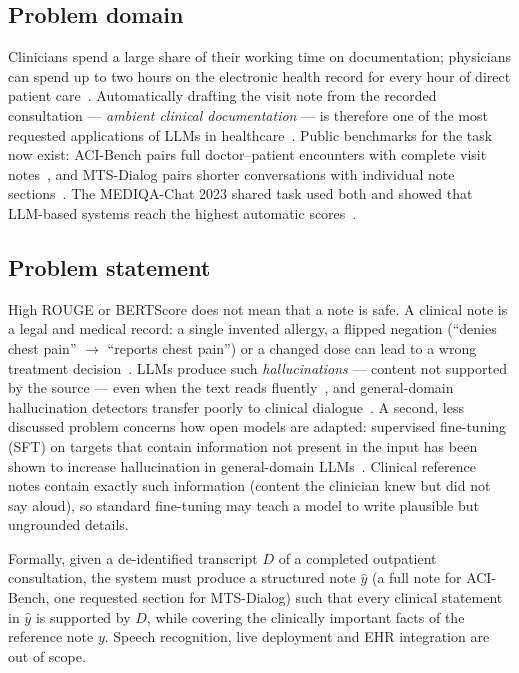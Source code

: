 \documentclass[conference]{IEEEtran}
\begin{document}
\subsection{Problem domain}
Clinicians spend a large share of their working time on documentation; physicians can spend up to two
hours on the electronic health record for every hour of direct patient care~\cite{vanveen2024}.
Automatically drafting the visit note from the recorded consultation --- \emph{ambient clinical
documentation} --- is therefore one of the most requested applications of LLMs in
healthcare~\cite{asgari2025,yim2023aci}. Public benchmarks for the task now exist: ACI-Bench pairs full
doctor--patient encounters with complete visit notes~\cite{yim2023aci}, and MTS-Dialog pairs shorter
conversations with individual note sections~\cite{abacha2023mts}. The MEDIQA-Chat 2023 shared task used
both and showed that LLM-based systems reach the highest automatic scores~\cite{abacha2023overview}.

\subsection{Problem statement}
High ROUGE or BERTScore does not mean that a note is safe. A clinical note is a legal and medical record:
a single invented allergy, a flipped negation (``denies chest pain'' $\rightarrow$ ``reports chest pain'')
or a changed dose can lead to a wrong treatment decision~\cite{asgari2025}. LLMs produce such
\emph{hallucinations} --- content not supported by the source --- even when the text reads
fluently~\cite{bn2025fact,das2025}, and general-domain hallucination detectors transfer poorly to clinical
dialogue~\cite{bn2025fact}. A second, less discussed problem concerns how open models are adapted:
supervised fine-tuning (SFT) on targets that contain information not present in the input has been shown to
increase hallucination in general-domain LLMs~\cite{gekhman2024,kaplan2026}. Clinical reference notes
contain exactly such information (content the clinician knew but did not say aloud), so standard
fine-tuning may teach a model to write plausible but ungrounded details.

Formally, given a de-identified transcript $D$ of a completed outpatient consultation, the system must
produce a structured note $\hat{y}$ (a full note for ACI-Bench, one requested section for MTS-Dialog) such
that every clinical statement in $\hat{y}$ is supported by $D$, while covering the clinically important
facts of the reference note $y$. Speech recognition, live deployment and EHR integration are out of scope.
\end{document}

